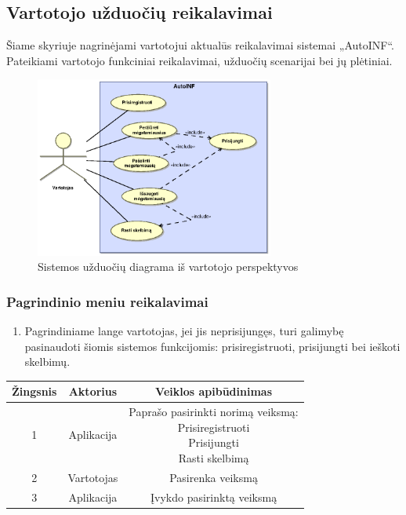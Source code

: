 \documentclass[12pt]{article}
\renewcommand{\thesubsection}{FR\arabic{subsection}}
\renewcommand*{\theenumi}{\thesubsection.\arabic{enumi}}
\renewcommand*{\theenumii}{\thesubsubsection.\theenumi.\arabic{enumii}}
\begin{document}
	\renewcommand*{\theenumi}{\thesubsubsection.\arabic{enumi}}
	\renewcommand*{\theenumii}{\thesubsubsection.\theenumi.\arabic{enumii}}
	\renewcommand*{\theenumiii}{\thesubsubsection.\theenumi.\theenumii.\arabic{enumiii}}
	\subsection{Vartotojo užduočių reikalavimai}\label{Vartotojo_reikalavimai}
	Šiame skyriuje nagrinėjami vartotojui aktualūs reikalavimai sistemai „AutoINF“. Pateikiami vartotojo funkciniai reikalavimai, užduočių scenarijai bei jų plėtiniai.
	
	\begin{figure}[h]
		\begin{center}
			\includegraphics[width=0.7\textwidth]{TikslaiVartotojas.eps}
			\caption{Sistemos užduočių diagrama iš vartotojo perspektyvos\label{UseCaseUser}}
		\end{center}
	\end{figure}
	\pagebreak
	
	\subsubsection{Pagrindinio meniu reikalavimai}
	\begin{enumerate}[labelindent=10pt,leftmargin=2.2cm]
		\item Pagrindiniame lange vartotojas, jei jis neprisijungęs, turi galimybę pasinaudoti šiomis sistemos funkcijomis: prisiregistruoti, prisijungti bei ieškoti skelbimų.
	\end{enumerate}
		
		\begin{center}
		\begin{tabular}{ | c | c | c | }
			\hline
			Žingsnis & Aktorius   & Veiklos apibūdinimas \\ \hline
			1        & Aplikacija & \makecell{Paprašo pasirinkti norimą veiksmą: \\ Prisiregistruoti \\ Prisijungti \\ Rasti skelbimą} \\ \hline
			2        & Vartotojas & Pasirenka veiksmą \\ \hline
			3        & Aplikacija & Įvykdo pasirinktą veiksmą \\ \hline
		\end{tabular}
		\bigskip
		\end{center}
		
\end{document}

